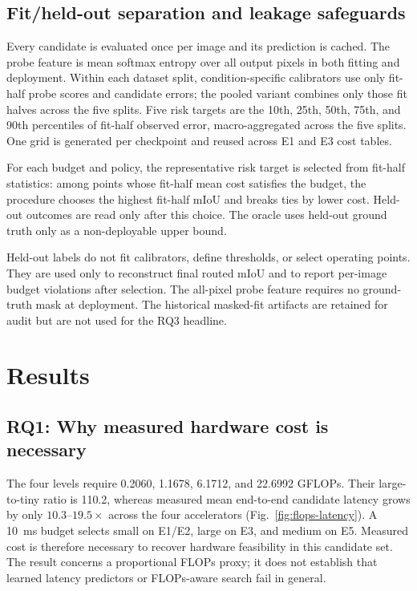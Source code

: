 \documentclass[a4paper,review,12pt]{elsarticle}
\newcommand{\miou}{mIoU}
\begin{document}
\subsection{Fit/held-out separation and leakage safeguards}
\label{sec:split}

Every candidate is evaluated once per image and its prediction is cached. The probe feature is mean softmax entropy over all output pixels in both fitting and deployment. Within each dataset split, condition-specific calibrators use only fit-half probe scores and candidate errors; the pooled variant combines only those fit halves across the five splits. Five risk targets are the 10th, 25th, 50th, 75th, and 90th percentiles of fit-half observed error, macro-aggregated across the five splits. One grid is generated per checkpoint and reused across E1 and E3 cost tables.

For each budget and policy, the representative risk target is selected from fit-half statistics: among points whose fit-half mean cost satisfies the budget, the procedure chooses the highest fit-half \miou{} and breaks ties by lower cost. Held-out outcomes are read only after this choice. The oracle uses held-out ground truth only as a non-deployable upper bound.

Held-out labels do not fit calibrators, define thresholds, or select operating points. They are used only to reconstruct final routed \miou{} and to report per-image budget violations after selection. The all-pixel probe feature requires no ground-truth mask at deployment. The historical masked-fit artifacts are retained for audit but are not used for the RQ3 headline.

\section{Results}
\label{sec:results}

\subsection{RQ1: Why measured hardware cost is necessary}

The four levels require 0.2060, 1.1678, 6.1712, and 22.6992 GFLOPs. Their large-to-tiny ratio is 110.2, whereas measured mean end-to-end candidate latency grows by only $10.3$--$19.5\times$ across the four accelerators (Fig.~\ref{fig:flops-latency}). A 10~ms budget selects small on E1/E2, large on E3, and medium on E5. Measured cost is therefore necessary to recover hardware feasibility in this candidate set. The result concerns a proportional FLOPs proxy; it does not establish that learned latency predictors or FLOPs-aware search fail in general.
\end{document}
